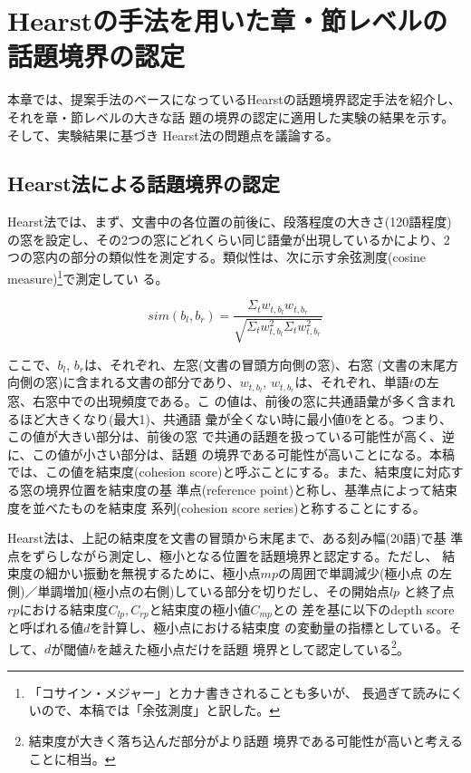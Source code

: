 \section{Hearstの手法を用いた章・節レベルの話題境界の認定}
\label{sect:Hearst法}

本章では、提案手法のベースになっているHearstの話題境界認定手法\cite[以
下Hearst法と称する]{PACL-32-P9}を紹介し、それを章・節レベルの大きな話
題の境界の認定に適用した実験の結果を示す。そして、実験結果に基づき
Hearst法の問題点を議論する。

\subsection{Hearst法による話題境界の認定}

Hearst法では、まず、文書中の各位置の前後に、段落程度の大きさ(120語程度)
の窓を設定し、その2つの窓にどれくらい同じ語彙が出現しているかにより、2
つの窓内の部分の類似性を測定する。類似性は、次に示す余弦測度(cosine
measure)\footnote{「コサイン・メジャー」とカナ書きされることも多いが、
  長過ぎて読みにくいので、本稿では「余弦測度」と訳した。}で測定してい
る。

\[
sim(b_{l}, b_{r}) = \frac{\Sigma_{t} w_{t,b_{l}} w_{t,b_{r}}}
{\sqrt{\Sigma_{t} w_{t,b_{l}}^{2} \Sigma_{t} w_{t,b_{r}}^{2}}}
\]

\noindent{}
ここで、$b_{l}$, $b_{r}$は、それぞれ、左窓(文書の冒頭方向側の窓)、右窓
(文書の末尾方向側の窓)に含まれる文書の部分であり、$w_{t,b_{l}}$,
$w_{t,b_{r}}$は、それぞれ、単語$t$の左窓、右窓中での出現頻度である。こ
の値は、前後の窓に共通語彙が多く含まれるほど大きくなり(最大1)、共通語
彙が全くない時に最小値0をとる。つまり、この値が大きい部分は、前後の窓
で共通の話題を扱っている可能性が高く、逆に、この値が小さい部分は、話題
の境界である可能性が高いことになる。本稿では、この値を結束度(cohesion
score)と呼ぶことにする。また、結束度に対応する窓の境界位置を結束度の基
準点(reference point)と称し、基準点によって結束度を並べたものを結束度
系列(cohesion score series)と称することにする。

Hearst法は、上記の結束度を文書の冒頭から末尾まで、ある刻み幅(20語)で基
準点をずらしながら測定し、極小となる位置を話題境界と認定する。ただし、
結束度の細かい振動を無視するために、極小点$mp$の周囲で単調減少(極小点
の左側)／単調増加(極小点の右側)している部分を切りだし、その開始点$lp$
と終了点$rp$における結束度$C_{lp}, C_{rp}$と結束度の極小値$C_{mp}$との
差を基に以下のdepth scoreと呼ばれる値$d$を計算し、極小点における結束度
の変動量の指標としている。そして、$d$が閾値$h$を越えた極小点だけを話題
境界として認定している\footnote{結束度が大きく落ち込んだ部分がより話題
  境界である可能性が高いと考えることに相当。}。

